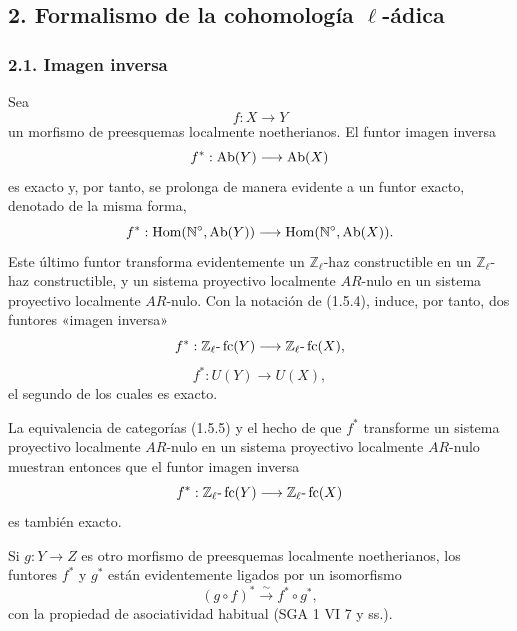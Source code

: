 \subsection*{2. Formalismo de la cohomología \(\ell\)-ádica}

\subsubsection*{2.1. Imagen inversa}

Sea
\[
f:X\longrightarrow Y
\]
un morfismo de preesquemas localmente noetherianos. El funtor imagen inversa
\[
f^*:\operatorname{Ab}(Y)\longrightarrow \operatorname{Ab}(X)
\]
es exacto y, por tanto, se prolonga de manera evidente a un funtor exacto, denotado de la misma forma,
\[
f^*:\operatorname{Hom}(\mathbb N^\circ,\operatorname{Ab}(Y))\longrightarrow \operatorname{Hom}(\mathbb N^\circ,\operatorname{Ab}(X)).
\]
Este último funtor transforma evidentemente un \(\mathbb Z_\ell\)-haz constructible en un \(\mathbb Z_\ell\)-haz constructible, y un sistema proyectivo localmente \(AR\)-nulo en un sistema proyectivo localmente \(AR\)-nulo. Con la notación de (1.5.4), induce, por tanto, dos funtores «imagen inversa»
\[
f^*:\mathbb Z_\ell\text{-}\operatorname{fc}(Y)\longrightarrow \mathbb Z_\ell\text{-}\operatorname{fc}(X),
\]
\[
f^*:U(Y)\longrightarrow U(X),
\]
el segundo de los cuales es exacto.

La equivalencia de categorías (1.5.5) y el hecho de que \(f^*\) transforme un sistema proyectivo localmente \(AR\)-nulo en un sistema proyectivo localmente \(AR\)-nulo muestran entonces que el funtor imagen inversa
\[
f^*:\mathbb Z_\ell\text{-}\operatorname{fc}(Y)\longrightarrow \mathbb Z_\ell\text{-}\operatorname{fc}(X)
\]
es también exacto.

Si \(g:Y\to Z\) es otro morfismo de preesquemas localmente noetherianos, los funtores \(f^*\) y \(g^*\) están evidentemente ligados por un isomorfismo
\[
(g\circ f)^*\xrightarrow{\sim}f^*\circ g^*,
\]
con la propiedad de asociatividad habitual (SGA 1 VI 7 y ss.).

